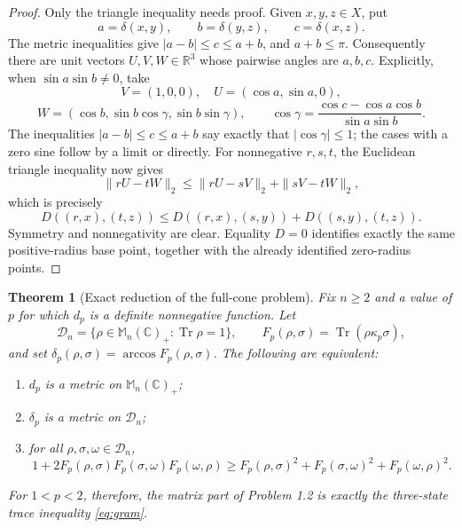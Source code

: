 \documentclass[11pt]{article}
\newtheorem{theorem}{Theorem}
\newcommand{\M}{\mathbb M}
\newcommand{\C}{\mathbb C}
\newcommand{\Tr}{\operatorname{Tr}}
\begin{document}
\begin{proof}
Only the triangle inequality needs proof.  Given $x,y,z\in X$, put
\[
 a=\delta(x,y),\qquad b=\delta(y,z),\qquad c=\delta(x,z).
\]
The metric inequalities give $|a-b|\leq c\leq a+b$, and $a+b\leq\pi$.
Consequently there are unit vectors $U,V,W\in\mathbb R^3$ whose pairwise
angles are $a,b,c$.  Explicitly, when $\sin a\sin b\ne0$, take
\[
 V=(1,0,0),\quad U=(\cos a,\sin a,0),
\]
\[
 W=(\cos b,\sin b\cos\gamma,\sin b\sin\gamma),\qquad
 \cos\gamma=\frac{\cos c-\cos a\cos b}{\sin a\sin b}.
\]
The inequalities $|a-b|\leq c\leq a+b$ say exactly that
$|\cos\gamma|\leq1$; the cases with a zero sine follow by a limit or directly.
For nonnegative $r,s,t$, the Euclidean triangle inequality now gives
\[
 \|rU-tW\|_2\leq\|rU-sV\|_2+\|sV-tW\|_2,
\]
which is precisely
\[
 D((r,x),(t,z))\leq D((r,x),(s,y))+D((s,y),(t,z)).
\]
Symmetry and nonnegativity are clear.  Equality $D=0$ identifies exactly the
same positive-radius base point, together with the already identified
zero-radius points.
\end{proof}

\begin{theorem}[Exact reduction of the full-cone problem]\label{thm:reduction}
Fix $n\geq2$ and a value of $p$ for which $d_p$ is a definite nonnegative
function.  Let
\[
 \mathcal D_n=\{\rho\in\M_n(\C)_+:\Tr\rho=1\},\qquad
 F_p(\rho,\sigma)=\Tr(\rho\mathbin{\kappa_p}\sigma),
\]
and set $\delta_p(\rho,\sigma)=\arccos F_p(\rho,\sigma)$.  The following are
equivalent:
\begin{enumerate}
  \item $d_p$ is a metric on $\M_n(\C)_+$;
  \item $\delta_p$ is a metric on $\mathcal D_n$;
  \item for all $\rho,\sigma,\omega\in\mathcal D_n$,
  \begin{equation}\label{eq:gram}
  1+2F_p(\rho,\sigma)F_p(\sigma,\omega)F_p(\omega,\rho)
  \geq F_p(\rho,\sigma)^2+F_p(\sigma,\omega)^2
       +F_p(\omega,\rho)^2.
  \end{equation}
\end{enumerate}
For $1<p<2$, therefore, the matrix part of Problem 1.2 is exactly the
three-state trace inequality \eqref{eq:gram}.
\end{theorem}
\end{document}
